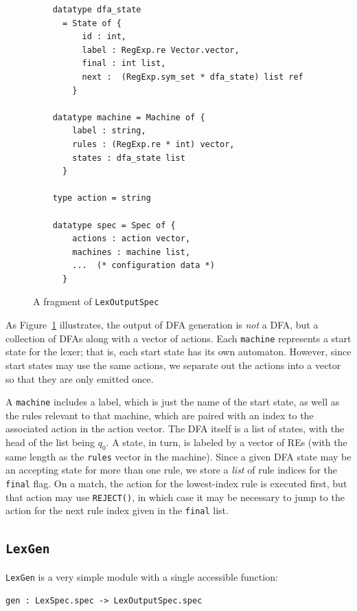 \documentclass[11pt]{article}
\newcommand{\nm}[1]{\texttt{#1}}
\begin{document}
\begin{figure}
\begin{verbatim}
    datatype dfa_state
      = State of {
          id : int,
          label : RegExp.re Vector.vector,
          final : int list,
          next :  (RegExp.sym_set * dfa_state) list ref
        }

    datatype machine = Machine of {
        label : string,
        rules : (RegExp.re * int) vector,
        states : dfa_state list
      }

    type action = string

    datatype spec = Spec of {
        actions : action vector,
        machines : machine list,
        ...  (* configuration data *)
      }
\end{verbatim}
\caption{A fragment of \nm{LexOutputSpec}}\label{fig:lex-output-spec}
\end{figure}

As Figure~\ref{fig:lex-output-spec} illustrates, the output of DFA generation is
\emph{not} a DFA, but a collection of DFAs along with a vector of actions. 
Each \nm{machine} represents a start state for the lexer; that is, each start
state has its own automaton.  However, since start states may use the same
actions, we separate out the actions into a vector so that they are only
emitted once.

A \nm{machine} includes a label, which is just the name of the start state, as
well as the rules relevant to that machine, which are paired with an index to
the associated action in the action vector.  The DFA itself is a list of
states, with the head of the list being $q_0$.  A state, in turn, is labeled by
a vector of REs (with the same length as the \nm{rules} vector in the machine).
 Since a given DFA state may be an accepting state for more than one rule, we
store a \emph{list} of rule indices for the \nm{final} flag.  On a match, the
action for the lowest-index rule is executed first, but that action may use
\nm{REJECT()}, in which case it may be necessary to jump to the action for the
next rule index given in the \nm{final} list.

\subsection{\nm{LexGen}}\label{sec:lex-gen}

\nm{LexGen} is a very simple module with a single accessible function:
\begin{center}
\nm{gen : LexSpec.spec -> LexOutputSpec.spec}
\end{center}
\end{document}

